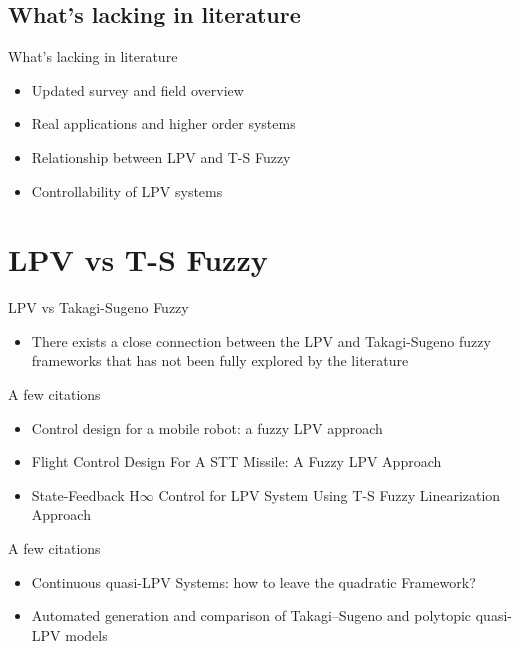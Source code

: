 \subsection{What's lacking in literature}
\begin{frame}{What's lacking in literature}
       \begin{itemize}
        \item Updated survey and field overview
        \item Real applications and higher order systems
        \item Relationship between LPV and T-S Fuzzy
        \item Controllability of LPV systems
    \end{itemize}
\end{frame}


\section{LPV vs T-S Fuzzy}
\begin{frame}{LPV vs Takagi-Sugeno Fuzzy}
    \begin{itemize}
        \item There exists a close connection between the LPV and Takagi-Sugeno fuzzy frameworks \autocite{Rotondo2018} that has not been fully explored by the literature
    \end{itemize}
\end{frame}

\begin{frame}{A few citations}
    \begin{itemize}
        \item Control design for a mobile robot: a fuzzy LPV approach \autocite{Tsourdos}
        
        \item Flight Control Design For A STT Missile: A Fuzzy LPV Approach \autocite{Blumel2017}
        
        \item State-Feedback H$\infty$ Control for LPV System Using T-S Fuzzy Linearization Approach \autocite{Liu2013}
        
    \end{itemize}
\end{frame}

\begin{frame}{A few citations}
    \begin{itemize}
    \item Continuous quasi-LPV Systems: how to leave the quadratic Framework? \autocite{JAADARI2013}
        
    \item Automated generation and comparison of Takagi–Sugeno and polytopic quasi-LPV models \autocite{Rotondo2015}
    \end{itemize}
\end{frame}

